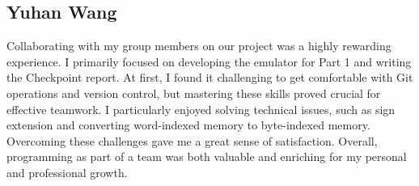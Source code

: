 \documentclass[11pt]{article}
\begin{document}
\subsection{Yuhan Wang}
Collaborating with my group members on our project was a highly rewarding 
experience. I primarily focused on developing the emulator for Part 1 and 
writing the Checkpoint report. At first, I found it challenging to get 
comfortable with Git operations and version control, but mastering these 
skills proved crucial for effective teamwork. I particularly enjoyed solving 
technical issues, such as sign extension and converting word-indexed memory 
to byte-indexed memory. Overcoming these challenges gave me a great sense of 
satisfaction. Overall, programming as part of a team was both valuable and 
enriching for my personal and professional growth.
\end{document}
